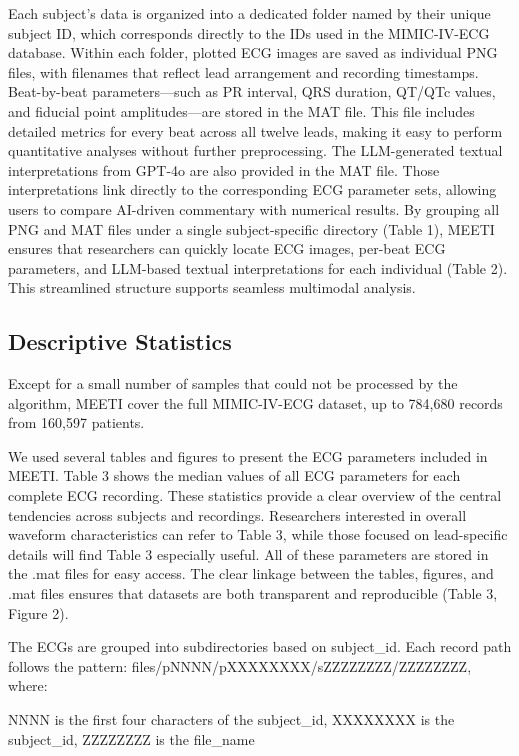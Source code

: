 \documentclass[12pt,letterpaper]{article}
\begin{document}
Each subject’s data is organized into a dedicated folder named by their unique subject ID, which corresponds directly to the IDs used in the MIMIC-IV-ECG database. Within each folder, plotted ECG images are saved as individual PNG files, with filenames that reflect lead arrangement and recording timestamps. Beat-by-beat parameters—such as PR interval, QRS duration, QT/QTc values, and fiducial point amplitudes—are stored in the MAT file. This file includes detailed metrics for every beat across all twelve leads, making it easy to perform quantitative analyses without further preprocessing. The LLM-generated textual interpretations from GPT-4o \cite{achiam2023gpt} are also provided in the MAT file. Those interpretations link directly to the corresponding ECG parameter sets, allowing users to compare AI-driven commentary with numerical results. By grouping all PNG and MAT files under a single subject-specific directory (Table 1), MEETI ensures that researchers can quickly locate ECG images, per-beat ECG parameters, and LLM-based textual interpretations for each individual  (Table 2). This streamlined structure supports seamless multimodal analysis.

\subsection*{Descriptive Statistics}

Except for a small number of samples that could not be processed by the algorithm, MEETI cover the full MIMIC-IV-ECG dataset, up to 784,680 records from 160,597 patients.

We used several tables and figures to present the ECG parameters included in MEETI. Table 3 shows the median values of all ECG parameters for each complete ECG recording. These statistics provide a clear overview of the central tendencies across subjects and recordings. Researchers interested in overall waveform characteristics can refer to Table 3, while those focused on lead-specific details will find Table 3 especially useful. All of these parameters are stored in the .mat files for easy access. The clear linkage between the tables, figures, and .mat files ensures that datasets are both transparent and reproducible (Table 3, Figure 2).

The ECGs are grouped into subdirectories based on subject\_id. Each record path follows the pattern: files/pNNNN/pXXXXXXXX/sZZZZZZZZ/ZZZZZZZZ, where:

NNNN is the first four characters of the subject\_id,
XXXXXXXX is the subject\_id,
ZZZZZZZZ is the file\_name
\end{document}
